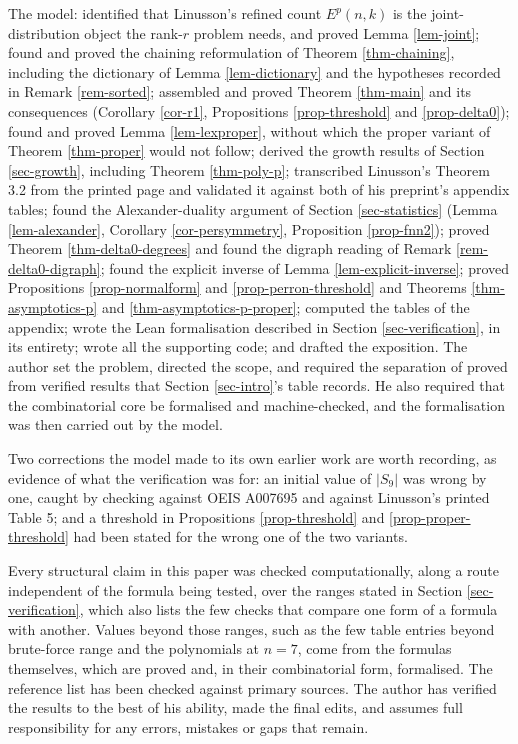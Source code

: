 \documentclass[11pt, a4paper, abstract=yes]{scrartcl}
\theoremstyle{definition}
\theoremstyle{remark}
\theoremstyle{plain}
\begin{document}
The model: identified that Linusson's refined count \(E^p(n,k)\) is the joint-distribution object the
rank-\(r\) problem needs, and proved Lemma \ref{lem-joint}; found and proved the chaining reformulation
of Theorem \ref{thm-chaining}, including the dictionary of Lemma \ref{lem-dictionary} and the hypotheses
recorded in Remark \ref{rem-sorted}; assembled and proved Theorem \ref{thm-main} and its consequences
(Corollary \ref{cor-r1}, Propositions \ref{prop-threshold} and \ref{prop-delta0}); found and proved
Lemma \ref{lem-lexproper}, without which the proper variant of Theorem \ref{thm-proper} would not follow;
derived the growth results of Section \ref{sec-growth}, including Theorem \ref{thm-poly-p}; transcribed
Linusson's Theorem 3.2 from the printed page and validated it against both of his preprint's
appendix tables;
found the Alexander-duality argument of Section \ref{sec-statistics} (Lemma \ref{lem-alexander},
Corollary \ref{cor-persymmetry}, Proposition \ref{prop-fnn2}); proved Theorem \ref{thm-delta0-degrees} and
found the digraph reading of Remark \ref{rem-delta0-digraph}; found the explicit inverse of Lemma
\ref{lem-explicit-inverse}; proved Propositions \ref{prop-normalform} and \ref{prop-perron-threshold} and
Theorems \ref{thm-asymptotics-p} and \ref{thm-asymptotics-p-proper}; computed the tables of the
appendix; wrote the Lean formalisation described in Section \ref{sec-verification}, in its
entirety; wrote all the supporting code; and drafted the exposition. The author set the problem,
directed the scope, and required the separation of proved from verified results that Section
\ref{sec-intro}'s table records. He also required that the combinatorial core be formalised and
machine-checked, and the formalisation was then carried out by the model.

Two corrections the model made to its own earlier work are worth recording, as evidence of what the
verification was for: an initial value of \(|S_9|\) was wrong by one, caught by checking against
OEIS A007695 and against Linusson's printed Table 5; and a threshold in Propositions \ref{prop-threshold}
and \ref{prop-proper-threshold} had been stated for the wrong one of the two variants.

Every structural claim in this paper was checked computationally, along a route independent of the
formula being tested, over the ranges stated in Section \ref{sec-verification}, which also lists the
few checks that compare one form of a formula with another. Values beyond those ranges, such as the
few table entries beyond brute-force range and the polynomials at \(n=7\), come from the formulas
themselves, which are proved and, in their combinatorial form, formalised. The reference list has
been checked against primary sources. The author has verified the results to the best of his ability, made the final edits, and
assumes full responsibility for any errors, mistakes or gaps that remain.
\end{document}
